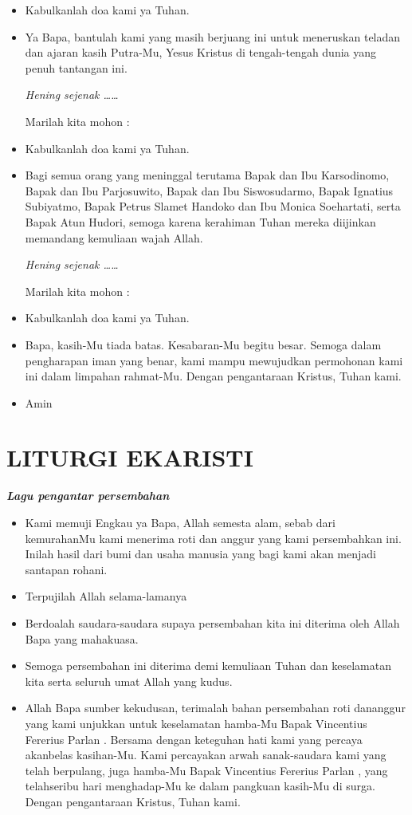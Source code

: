 \documentclass[titlepage,10pt,openany]{scrbook}
\makeatletter
\newcommand{\lagu}[1]{%
  {\parindent \z@ 
    \interlinepenalty\@M \slshape \bfseries \normalsize \textit{#1}\par\nobreak \vskip 10\p@ }}
\newcommand{\BU}[1]{\begin{itemize} \item[U:] #1 \end{itemize}}
\newcommand{\BI}[1]{\begin{itemize} \item[I:] #1 \end{itemize}}
\newcommand{\BP}[1]{\begin{itemize} \item[P:] #1 \end{itemize}}
\newcommand{\namaalm}{Bapak Vincentius Fererius Parlan }
\makeatother
\begin{document}
\BU{Kabulkanlah doa kami ya Tuhan.}

\BP{Ya Bapa, bantulah kami yang masih berjuang ini untuk meneruskan teladan dan ajaran kasih Putra-Mu, Yesus Kristus di tengah-tengah dunia yang penuh tantangan ini.

\textit{Hening sejenak \ldots\ldots} 

Marilah kita mohon :}

\BU{Kabulkanlah doa kami ya Tuhan.}

\BP{Bagi semua orang yang meninggal terutama Bapak dan Ibu Karsodinomo, Bapak dan Ibu Parjosuwito, Bapak dan Ibu Siswosudarmo, Bapak Ignatius Subiyatmo, Bapak Petrus Slamet Handoko dan Ibu Monica Soehartati, serta Bapak Atun Hudori, semoga karena kerahiman Tuhan mereka diijinkan memandang
	kemuliaan wajah Allah.
	
	\textit{Hening sejenak \ldots\ldots} 
	
	Marilah kita mohon :}

\BU{Kabulkanlah doa kami ya Tuhan.}

\BI{Bapa, kasih-Mu tiada batas. Kesabaran-Mu begitu besar. Semoga dalam pengharapan iman yang benar, kami mampu mewujudkan permohonan kami ini dalam limpahan rahmat-Mu. Dengan pengantaraan Kristus, Tuhan kami.}

\BU{Amin}

\section*{LITURGI EKARISTI}

\lagu{Lagu pengantar persembahan}


\BI{Kami memuji Engkau ya Bapa, Allah semesta alam, sebab 
dari kemurahanMu kami menerima roti dan anggur yang 
kami persembahkan ini. Inilah hasil dari bumi dan usaha 
manusia yang bagi kami akan menjadi santapan rohani.}

\BU{Terpujilah Allah selama-lamanya}

\BI{Berdoalah saudara-saudara supaya persembahan kita ini 
diterima oleh Allah Bapa yang mahakuasa.}

\BU{Semoga persembahan ini diterima demi kemuliaan Tuhan 
dan keselamatan kita serta seluruh umat Allah yang kudus.}

\BI{Allah Bapa sumber kekudusan, terimalah bahan persembahan roti dananggur yang kami unjukkan untuk keselamatan hamba-Mu \namaalm. Bersama dengan keteguhan hati kami yang percaya akanbelas kasihan-Mu. Kami percayakan arwah sanak-saudara kami yang telah  berpulang,  juga   hamba-Mu  \namaalm,  yang  telahseribu   hari   menghadap-Mu   ke   dalam     pangkuan   kasih-Mu   di   surga. Dengan pengantaraan Kristus, Tuhan kami.}
\end{document}
